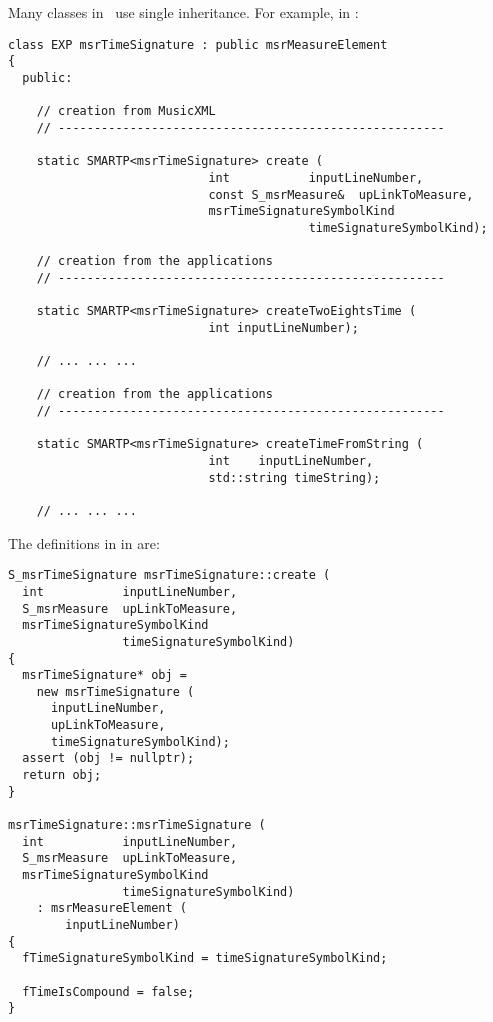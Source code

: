 Many classes in \mf\ use single inheritance. For example, in :
\begin{lstlisting}[language=CPlusPlus]
class EXP msrTimeSignature : public msrMeasureElement
{
  public:

    // creation from MusicXML
    // ------------------------------------------------------

    static SMARTP<msrTimeSignature> create (
                            int           inputLineNumber,
                            const S_msrMeasure&  upLinkToMeasure,
                            msrTimeSignatureSymbolKind
                                          timeSignatureSymbolKind);

    // creation from the applications
    // ------------------------------------------------------

    static SMARTP<msrTimeSignature> createTwoEightsTime (
                            int inputLineNumber);

    // ... ... ...

    // creation from the applications
    // ------------------------------------------------------

    static SMARTP<msrTimeSignature> createTimeFromString (
                            int    inputLineNumber,
                            std::string timeString);

    // ... ... ...
\end{lstlisting}

The definitions in in  are:
\begin{lstlisting}[language=CPlusPlus]
S_msrTimeSignature msrTimeSignature::create (
  int           inputLineNumber,
  S_msrMeasure  upLinkToMeasure,
  msrTimeSignatureSymbolKind
                timeSignatureSymbolKind)
{
  msrTimeSignature* obj =
    new msrTimeSignature (
      inputLineNumber,
      upLinkToMeasure,
      timeSignatureSymbolKind);
  assert (obj != nullptr);
  return obj;
}

msrTimeSignature::msrTimeSignature (
  int           inputLineNumber,
  S_msrMeasure  upLinkToMeasure,
  msrTimeSignatureSymbolKind
                timeSignatureSymbolKind)
    : msrMeasureElement (
        inputLineNumber)
{
  fTimeSignatureSymbolKind = timeSignatureSymbolKind;

  fTimeIsCompound = false;
}
\end{lstlisting}


